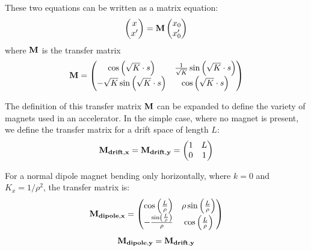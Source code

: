 \documentclass[11pt]{report}
\begin{document}
These two equations can be written as a matrix equation:
\begin{equation}
  \begin{pmatrix}
    x \\
    x'
  \end{pmatrix}
  =
  \bf{M}
  \begin{pmatrix}
    x_0 \\
    x'_0
  \end{pmatrix}
\end{equation}
where $\bf{M}$ is the transfer matrix
\begin{equation}
  \bf{M}=
  \begin{pmatrix}
    \cos\left(\sqrt{K}\cdot s\right) & \frac1{\sqrt{K}}\sin\left(\sqrt{K}\cdot s\right) \\
    -\sqrt{K}\sin\left(\sqrt{K}\cdot s\right) & \cos\left(\sqrt{K}\cdot s\right)
  \end{pmatrix}
\end{equation}

The definition of this transfer matrix $\bf M$ can be expanded to define the variety of magnets used in an accelerator. In the simple case, where no magnet is present, we define the transfer matrix for a drift space of length $L$:
\begin{equation}
  \bf{M}_{drift,x}=\bf{M}_{drift,y}=
  \begin{pmatrix}
    1 & L \\
    0 & 1
  \end{pmatrix}
\end{equation}

For a normal dipole magnet bending only horizontally, where $k=0$ and $K_x=1/\rho^2$, the transfer matrix is:
\begin{equation}
  \bf{M}_{dipole,x}=
  \begin{pmatrix}
    \cos\left(\frac L\rho\right) & \rho\sin\left(\frac L\rho\right) \\
    -\frac{\sin\left(\frac L\rho\right)}{\rho} & \cos\left(\frac L\rho\right)
  \end{pmatrix}
\end{equation}
\begin{equation}
  \bf{M}_{dipole,y}=\bf{M}_{drift,y}
\end{equation}
\end{document}
